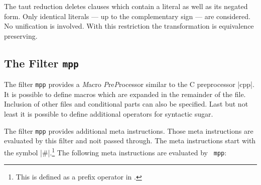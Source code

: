 The taut reduction deletes clauses which contain a literal as well as its
negated form. Only identical literals --- up to the complementary sign --- are
considered. No unification is involved. With this restriction the
transformation is equivalence preserving.


\subsection{The Filter {\tt mpp}}

The filter {\tt mpp} provides a {\em M}\/acro {\em P}\/re{\em P}\/rocessor
similar to the C preprocessor |cpp|. It is possible to define macros which are
expanded in the remainder of the file. Inclusion of other files and
conditional parts can also be specified. Last but not least it is possible to
define additional operators for syntactic sugar.

The filter {\tt mpp} provides additional meta instructions. Those meta
instructions are evaluated by this filter and noit passed through. The meta
instructions start with the symbol |#|.\footnote{This is defined as a prefix
  operator in \ProTop.} The following meta instructions are evaluated by {\tt
  mpp}: 

